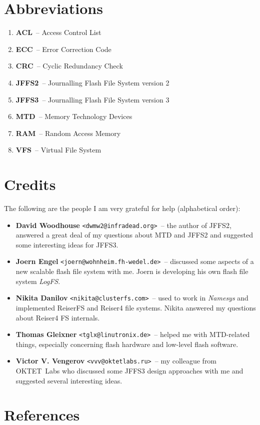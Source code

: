 \documentclass[12pt,a4paper,oneside,titlepage]{article}
\begin{document}
\section{Abbreviations}
\begin{enumerate}
\item \textbf{ACL}~-- Access Control List
\item \textbf{ECC}~-- Error Correction Code
\item \textbf{CRC}~-- Cyclic Redundancy Check
\item \textbf{JFFS2}~-- Journalling Flash File System version 2
\item \textbf{JFFS3}~-- Journalling Flash File System version 3
\item \textbf{MTD}~-- Memory Technology Devices
\item \textbf{RAM}~-- Random Access Memory
\item \textbf{VFS}~-- Virtual File System
\end{enumerate}

%
%
\section{Credits}
The following are the people I am very grateful for help (alphabetical order):

\begin{itemize}

\item \textbf{David Woodhouse} \texttt{<dwmw2@infradead.org>}~-- the author of
JFFS2, answered a great deal of my questions about MTD and JFFS2 and suggested
some interesting ideas for JFFS3.

\item \textbf{Joern Engel} \texttt{<joern@wohnheim.fh-wedel.de>}~-- discussed
some aspects of a new scalable flash file system with me. Joern is developing
his own flash file system \emph{LogFS}.

\item \textbf{Nikita Danilov} \texttt{<nikita@clusterfs.com>}~-- used to work
in \emph{Namesys} and implemented ReiserFS and Reiser4 file systems.
Nikita answered my questions about Reiser4 FS internals.

\item \textbf{Thomas Gleixner} \texttt{<tglx@linutronix.de>}~-- helped me with
MTD-related things, especially concerning flash hardware and low-level flash
software.

\item \textbf{Victor V. Vengerov} \texttt{<vvv@oktetlabs.ru>}~-- my colleague
from OKTET~Labs who discussed some JFFS3 design approaches with me and
suggested several interesting ideas.

\end{itemize}

%
%
\section{References}


\end{document}
